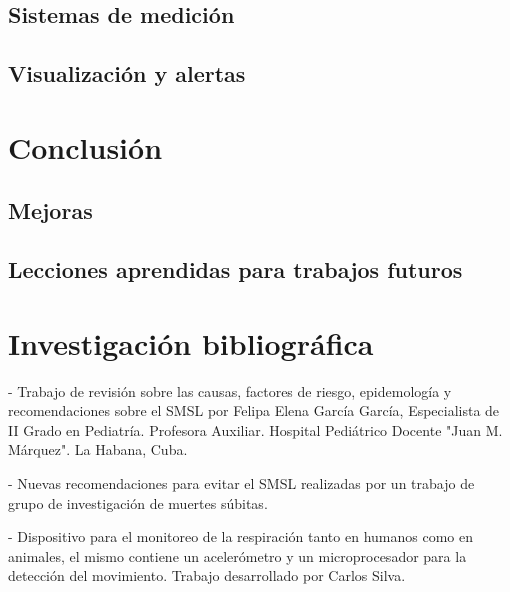 \documentclass{IEEEtran}
\begin{document}
			
		\subsection{Sistemas de medición}
		
		\subsection{Visualización y alertas}
	
	\section{Conclusión}

		\subsection{Mejoras}


		\subsection{Lecciones aprendidas para trabajos futuros}

	\section{Investigación bibliográfica}
		\nocite{*}
	
		\cite{garcia2008sindrome} - Trabajo de revisión sobre las causas, factores de riesgo, epidemología y recomendaciones sobre el SMSL por Felipa Elena García García, Especialista de II Grado en Pediatría. Profesora Auxiliar. Hospital Pediátrico Docente "Juan M. Márquez". La Habana, Cuba.

		\cite{subita2000nuevas} - Nuevas recomendaciones para evitar el SMSL realizadas por un trabajo de grupo de investigación de muertes súbitas.

		\cite{silva2008device} - Dispositivo para el monitoreo de la respiración tanto en humanos como en animales, el mismo contiene un acelerómetro y un microprocesador para la detección del movimiento. Trabajo desarrollado por Carlos Silva.
\end{document}
